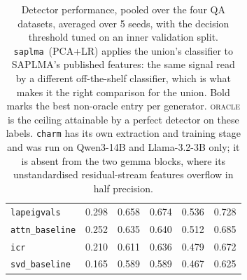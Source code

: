 \begin{table}[t]
\begin{tabular}{l r r r r r}
    \texttt{lapeigvals}            & 0.298 & 0.658 & 0.674 & 0.536 & 0.728 \\
    \texttt{attn\_baseline}        & 0.252 & 0.635 & 0.640 & 0.512 & 0.685 \\
    \texttt{icr}                   & 0.210 & 0.611 & 0.636 & 0.479 & 0.672 \\
    \texttt{svd\_baseline}         & 0.165 & 0.589 & 0.589 & 0.467 & 0.625 \\
    \bottomrule
  \end{tabular}
  \caption{Detector performance, pooled over the four QA datasets, averaged over 5 seeds,
  with the decision threshold tuned on an inner validation split.
  \texttt{saplma}~(PCA+LR) applies the union's classifier to SAPLMA's published features:
  the same signal read by a different off-the-shelf classifier, which is what makes it the
  right comparison for the union. Bold marks the best non-oracle entry per generator.
  \textsc{oracle} is the ceiling attainable by a perfect detector on these labels.
  \texttt{charm} has its own extraction and training stage and was run on Qwen3-14B and
  Llama-3.2-3B only; it is absent from the two \mbox{gemma} blocks, where its
  unstandardised residual-stream features overflow in half precision.}
  \label{tab:detector-performance}
\end{table}

